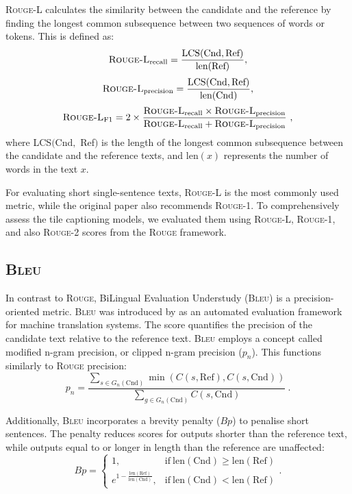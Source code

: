 \documentclass{l4proj}
\begin{document}
\textsc{Rouge-L} calculates the similarity between the candidate and the reference by finding the longest common subsequence between two sequences of words or tokens. This is defined as:
\begin{equation}
    \textsc{Rouge-L}_\text{recall} = \frac{\text{LCS}(\text{Cnd}, \text{Ref})}{\text{len}(\text{Ref})},
\end{equation}
\begin{equation}
    \textsc{Rouge-L}_{\text{precision}} = \frac{\text{LCS}(\text{Cnd}, \text{Ref})}{\text{len}(\text{Cnd})},
\end{equation}
\begin{equation}
    \textsc{Rouge-L}_{\text{F1}} = 2 \times \frac{\textsc{Rouge-L}_\text{recall} \times \textsc{Rouge-L}_\text{precision}}{\textsc{Rouge-L}_\text{recall} + \textsc{Rouge-L}_\text{precision}}\ ,
\end{equation}
where LCS$($Cnd$,$ Ref$)$ is the length of the longest common subsequence between the candidate and the reference texts, and len$(x)$ represents the number of words in the text $x$.

For evaluating short single-sentence texts, \textsc{Rouge-L} is the most commonly used metric, while the original paper also recommends \textsc{Rouge-1}. To comprehensively assess the tile captioning models, we evaluated them using \textsc{Rouge-L}, \textsc{Rouge-1}, and also \textsc{Rouge-2} scores from the \textsc{Rouge} framework.

\subsection{\textsc{Bleu}}
In contrast to \textsc{Rouge}, BiLingual Evaluation Understudy (\textsc{Bleu}) is a precision-oriented metric. \textsc{Bleu} was introduced by \cite{papineni2002} as an automated evaluation framework for machine translation systems. The score quantifies the precision of the candidate text relative to the reference text.
\textsc{Bleu} employs a concept called modified n-gram precision, or clipped n-gram precision ($p_n$). This functions similarly to \textsc{Rouge} precision:
\begin{equation}
    p_n = \frac{\sum\limits_{s \in G_n(\text{Cnd})}\min\left( C(s, \text{Ref}), C(s, \text{Cnd})\right)}{\sum\limits_{g \in G_n(\text{Cnd})}C(s, \text{Cnd})}\ .
\end{equation}

Additionally, \textsc{Bleu} incorporates a brevity penalty ($Bp$) to penalise short sentences. The penalty reduces scores for outputs shorter than the reference text, while outputs equal to or longer in length than the reference are unaffected:
\begin{equation}
    Bp = 
    \begin{cases}
        1, & \text{if}\ \text{len}(\text{Cnd}) \geq \text{len}(\text{Ref}) \\
        e^{1-\frac{\text{len}(\text{Ref})}{\text{len}(\text{Cnd})}}, & \text{if}\ \text{len}(\text{Cnd}) < \text{len}(\text{Ref})
    \end{cases}
    .
\end{equation}
\end{document}
